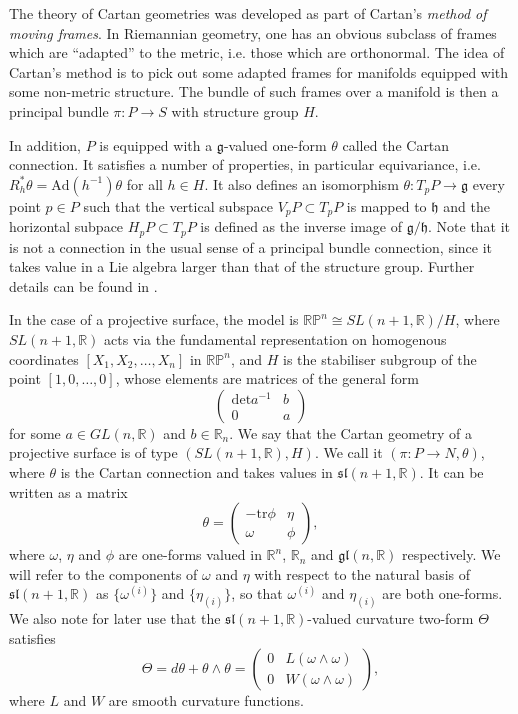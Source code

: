 The theory of Cartan geometries was developed as part of Cartan's
\textit{method of moving frames}. In Riemannian geometry, one has
an obvious subclass of frames which are ``adapted'' to the metric,
i.e. those which are orthonormal. The idea of Cartan's method is to
pick out some adapted frames for manifolds equipped with some non-metric
structure. The bundle of such frames over a manifold is then a principal
bundle $\pi:P\rightarrow S$ with structure group $H$.

In addition, $P$ is equipped with a $\mathfrak{g}$-valued one-form
$\theta$ called the Cartan connection. It satisfies a number of properties,
in particular equivariance, i.e. $R_{h}^{*}\theta=\mathrm{Ad}(h^{-1})\theta$
for all $h\in H$. It also defines an isomorphism $\theta:T_{p}P\rightarrow\mathfrak{g}$
every point $p\in P$ such that the vertical subspace $V_{p}P\subset T_{p}P$
is mapped to $\mathfrak{h}$ and the horizontal subpace $H_{p}P\subset T_{p}P$
is defined as the inverse image of $\mathfrak{g}/\mathfrak{h}$. Note
that it is not a connection in the usual sense of a principal bundle
connection, since it takes value in a Lie algebra larger than that
of the structure group. Further details can be found in \cite{Sharpe1997}.

In the case of a projective surface, the model is $\mathbb{RP}^{n}\cong SL(n+1,\mathbb{R})/H$,
where $SL(n+1,\mathbb{R})$ acts via the fundamental representation
on homogenous coordinates $[X_1,X_2,\dots,X_n]$ in $\mathbb{RP}^{n}$, and $H$
is the stabiliser subgroup of the point $[1,0,\dots,0]$, whose elements
are matrices of the general form
\[
\begin{pmatrix}\mathrm{det}a^{-1} & b\\
0 & a
\end{pmatrix}
\]
for some $a\in GL(n,\mathbb{R})$ and $b\in\mathbb{R}_{n}$. We say
that the Cartan geometry of a projective surface is of type $(SL(n+1,\mathbb{R}),H)$.
We call it $(\pi:P\rightarrow N,\theta)$, where $\theta$ is the
Cartan connection and takes values in $\mathfrak{sl}(n+1,\mathbb{R})$.
It can be written as a matrix
\[
\theta=\begin{pmatrix}-\mathrm{tr}\phi & \eta\\
\omega & \phi
\end{pmatrix},
\]
where $\omega$, $\eta$ and $\phi$ are one-forms valued in $\mathbb{R}^{n}$,
$\mathbb{R}_{n}$ and $\mathfrak{gl}(n,\mathbb{R})$ respectively.
We will refer to the components of $\omega$ and $\eta$ with respect
to the natural basis of $\mathfrak{sl}(n+1,\mathbb{R})$ as $\{\omega^{(i)}\}$
and $\{\eta_{(i)}\}$, so that $\omega^{(i)}$ and $\eta_{(i)}$ are
both one-forms. We also note for later use that the $\mathfrak{sl}(n+1,\mathbb{R})$-valued
curvature two-form $\Theta$ satisfies
\[
\Theta=d\theta+\theta\wedge\theta=\begin{pmatrix}0 & L(\omega\wedge\omega)\\
0 & W(\omega\wedge\omega)
\end{pmatrix},
\]
where $L$ and $W$ are smooth curvature functions.


